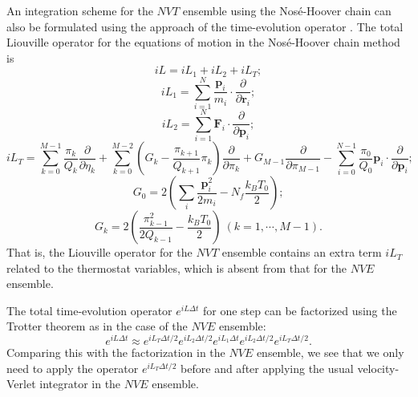 \documentclass[12pt,a4paper]{report}
\newcommand{\vect}[1]{\boldsymbol{#1}}
\begin{document}
An integration scheme for the $NVT$ ensemble using the Nos\'{e}-Hoover chain can also be formulated using the approach of the time-evolution operator \cite{martyna1996mp,tuckerman2010}. The total Liouville operator for the equations of motion in the Nos\'{e}-Hoover chain method is \cite{martyna1996mp,tuckerman2010}
\begin{equation}
iL = iL_1 + iL_2 + iL_T;
\end{equation}
\begin{equation}
iL_1 = \sum_{i=1}^N
\frac{\vect{p}_i}{m_i} \cdot
\frac{\partial }{\partial \vect{r}_i};
\end{equation}
\begin{equation}
iL_2 = \sum_{i=1}^N
\vect{F}_i \cdot
\frac{\partial }{\partial \vect{p}_i};
\end{equation}
\begin{equation}
iL_T =
\sum_{k=0}^{M-1} \frac{\pi_k}{Q_k}\frac{\partial}{\partial \eta_k} +
\sum_{k=0}^{M-2} \left(G_k - \frac{\pi_{k+1}}{Q_{k+1}}\pi_k\right)
     \frac{\partial}{\partial \pi_k}                               +
G_{M-1} \frac{\partial}{\partial \pi_{M-1}}                        -
\sum_{i=0}^{N-1}
\frac{\pi_0}{Q_0} \vect{p}_i \cdot \frac{\partial}{\partial \vect{p}_i};
\end{equation}
\begin{equation}
G_0 = 2\left(
\sum_i \frac{\vect{p}_i^2}{2m_i} - N_f\frac{k_BT_0}{2}
\right);
\end{equation}
\begin{equation}
G_k = 2\left( \frac{\pi_{k-1}^2}{2Q_{k-1}} - \frac{k_BT_0}{2} \right) ~(k = 1, \cdots, M-1).
\end{equation}
That is, the Liouville operator for the $NVT$ ensemble contains an extra term $iL_T$ related to the thermostat variables, which is absent from that for the $NVE$ ensemble.

The total time-evolution operator $e^{iL\Delta t} $ for one step can be factorized using the Trotter theorem as in the case of the $NVE$ ensemble:
\begin{equation}
e^{iL\Delta t} \approx
e^{iL_T\Delta t/2}
e^{iL_2\Delta t/2}
e^{iL_1\Delta t}
e^{iL_2\Delta t/2}
e^{iL_T\Delta t/2}.
\end{equation}
Comparing this with the factorization in the $NVE$ ensemble, we see that we only need to apply the operator $e^{iL_T\Delta t/2}$ before and after applying the usual velocity-Verlet integrator in the $NVE$ ensemble.
\end{document}
